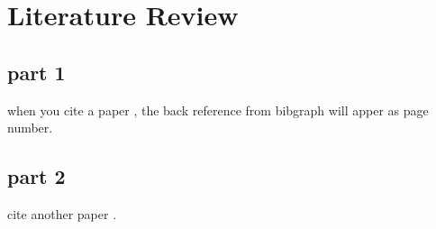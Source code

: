 
\chapter{Literature Review} %
\label{ch:literature_review} %


\section{part 1}

when you cite a paper \cite{bauschke2011convex}, the back reference from bibgraph will apper as page number.

\section{part 2}

cite another paper \cite{DynamicOptim_Opportunities_challenges}.
